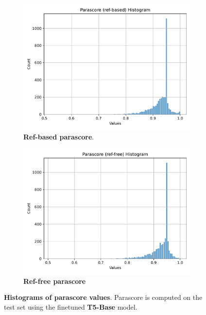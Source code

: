 \documentclass[fleqn,moreauthors,10pt]{ds_report}
\begin{document}
\begin{figure}[ht]
    \centering
    \begin{subfigure}{0.45\linewidth} %
        \centering
        \includegraphics[width=\textwidth]{report/fig/t5-base-parascore-ref-based-hist.pdf}
        \caption{\textbf{Ref-based parascore}.}
        \label{fig:t5-base-parascore-ref-based-hist}
    \end{subfigure}
    \hfill %
    \begin{subfigure}{0.45\linewidth} %
        \centering
        \includegraphics[width=\textwidth]{report/fig/t5-base-parascore-ref-free-hist.pdf}
        \caption{\textbf{Ref-free parascore}}
        \label{fig:t5-base-parascore-ref-free-hist}
    \end{subfigure}
    \caption{\textbf{Histograms of parascore values}. Parascore is computed on the test set using the finetuned \textbf{T5-Base} model.}
    \label{fig:t5-base-parascore-hist}
\end{figure}
\end{document}
